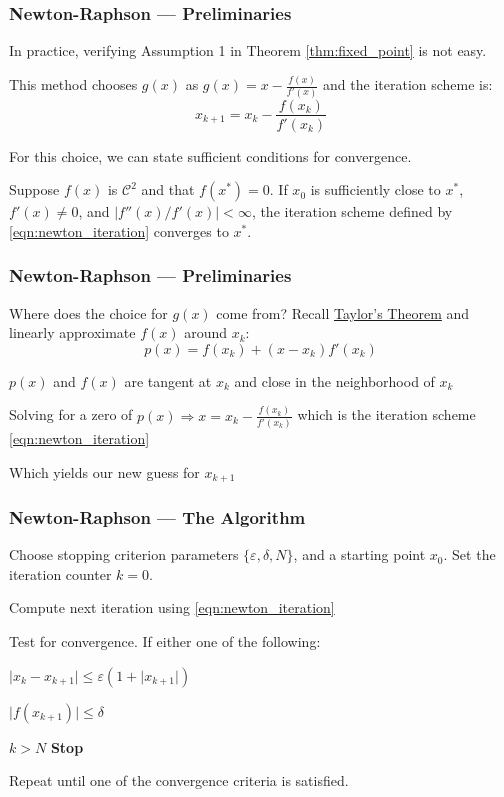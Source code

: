 \documentclass[11pt,xcolor={svgnames},aspectratio=169,usepdftitle=false]{beamer}
\let\toneitemize\itemize
\let\ttwoitemize\enditemize
\renewenvironment{itemize}{\toneitemize\addtolength{\itemsep}{0.7\baselineskip}}{\ttwoitemize}
\let\toneenumer\enumerate
\let\ttwoenumer\endenumerate
\renewenvironment{enumerate}{\toneenumer\addtolength{\itemsep}{0.7\baselineskip}}{\ttwoenumer}
\begin{document}
\begin{frame}
  \frametitle{Newton-Raphson --- Preliminaries}
\begin{itemize}
  \item In practice, verifying Assumption 1 in Theorem \ref{thm:fixed_point} is not easy.
  \item This method chooses $g(x)$ as $g(x) = x - \frac{f(x)}{f'(x)}$ and the iteration scheme is:
  \begin{equation}
  x_{k+1} = x_k - \frac{f(x_k)}{f'(x_k)} \label{eqn:newton_iteration}
  \end{equation}
  \item For this choice, we can state sufficient conditions for convergence.
\end{itemize}

\begin{theorem}
Suppose $f(x)$ is $\mathcal{C}^2$ and that $f(x^*) = 0$. If $x_0$ is sufficiently close to $x^*$, $f'(x)\neq 0$, and $\lvert f''(x) / f'(x)\rvert < \infty$, the iteration scheme defined by \eqref{eqn:newton_iteration} converges to $x^*$.
\end{theorem}
\end{frame}

\begin{frame}
  \frametitle{Newton-Raphson --- Preliminaries}
Where does the choice for $g(x)$ come from? Recall \href{https://en.wikipedia.org/wiki/Taylor's_theorem}{Taylor's Theorem} and linearly approximate $f(x)$ around $x_k$:
\[
p(x) = f(x_k) + (x - x_k)f'(x_k)
\]
\begin{itemize}
  \item $p(x)$ and $f(x)$ are tangent at $x_k$ and close in the neighborhood of $x_k$
  \item Solving for a zero of $p(x) \Rightarrow x = x_k - \frac{f(x_k)}{f'(x_k)}$ which is the iteration scheme \eqref{eqn:newton_iteration}
  \item Which yields our new guess for $x_{k+1}$
\end{itemize}
\end{frame}

\begin{frame}
  \frametitle{Newton-Raphson --- The Algorithm}
\begin{enumerate}
  \item Choose stopping criterion parameters $\{\varepsilon, \delta, N\}$, and a starting point $x_0$. Set the iteration counter $k = 0$.
  \item Compute next iteration using \eqref{eqn:newton_iteration}
  \item Test for convergence. If either one of the following:
  \begin{itemize}
    \item $\lvert x_k - x_{k+1} \rvert \leq \varepsilon (1 + \lvert x_{k+1}\rvert)$
    \item $\lvert f(x_{k+1}) \rvert \leq \delta$
    \item $k > N$
  \end{itemize}
  \textbf{Stop}
  \item Repeat until one of the convergence criteria is satisfied.
\end{enumerate}
\end{frame}
\end{document}
